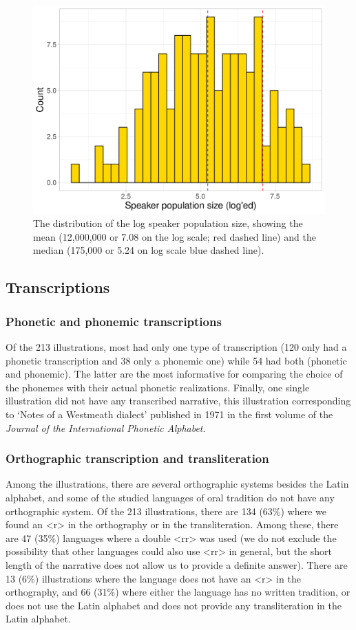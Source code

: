 \begin{figure}
	\centering
	\includegraphics[width=0.7\linewidth]{jipa/images/graph_population_JIPA}
	\caption[Distribution of the log speaker population size]{The distribution of the log speaker population size, showing the mean (12,000,000 or 7.08 on the log scale; red dashed line) and the median (175,000 or 5.24 on log scale blue dashed line).}
	\label{fig:graphpopulationjipa}
\end{figure}

\subsection{Transcriptions}

\subsubsection{Phonetic and phonemic transcriptions}

Of the 213 illustrations, most had only one type of transcription (120 only had a phonetic transcription and 38 only a phonemic one) while 54 had both (phonetic and phonemic). The latter are the most informative for comparing the choice of the phonemes with their actual phonetic realizations. Finally, one single illustration did not have any transcribed narrative, this illustration corresponding to ‘Notes of a Westmeath dialect’ published in 1971 in the first volume of the \textit{Journal of the International Phonetic Alphabet}. 

\subsubsection{Orthographic transcription and transliteration}

Among the illustrations, there are several orthographic systems besides the Latin alphabet, and some of the studied languages of oral tradition do not have any orthographic system. Of the 213 illustrations, there are 134 (63\%) where we found an <r> in the orthography or in the transliteration. Among these, there are 47 (35\%) languages where a double <rr> was used (we do not exclude the possibility that other languages could also use <rr> in general, but the short length of the narrative does not allow us to provide a definite answer). There are 13 (6\%) illustrations where the language does not have an <r> in the orthography, and 66 (31\%) where either the language has no written tradition, or does not use the Latin alphabet and does not provide any transliteration in the Latin alphabet.

